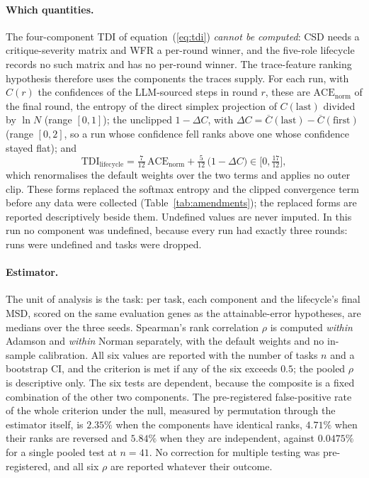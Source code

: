 \paragraph{Which quantities.} The four-component TDI of equation~(\ref{eq:tdi})
\emph{cannot be computed}: CSD needs a critique-severity matrix and WFR a per-round winner,
and the five-role lifecycle records no such matrix and has no per-round winner. The trace-feature ranking hypothesis therefore uses the components the
traces supply. For each run, with $C(r)$ the confidences of the LLM-sourced steps in round $r$,
these are $\mathrm{ACE}_{\mathrm{norm}}$ of the final round, the entropy of the direct simplex
projection of $C(\text{last})$ divided by $\ln N$ (range $[0,1]$); the unclipped $1-\Delta C$, with
$\Delta C=\overline{C}(\text{last})-\overline{C}(\text{first})$ (range $[0,2]$, so a run whose
confidence fell ranks above one whose confidence stayed flat); and
\begin{equation}
  \mathrm{TDI}_{\mathrm{lifecycle}} = \tfrac{7}{12}\,\mathrm{ACE}_{\mathrm{norm}}
    + \tfrac{5}{12}\,\bigl(1-\Delta C\bigr) \in \bigl[0,\tfrac{17}{12}\bigr],
\end{equation}
which renormalises the default weights over the two terms and applies no outer clip. These forms
replaced the softmax entropy and the clipped convergence term before any data were collected
(Table~\ref{tab:amendments}); the replaced forms are reported descriptively beside them.
Undefined values are never imputed. In this run no component was undefined, because every run
had exactly three rounds: \resHFourRunsUndefined{} runs were undefined and
\resHFourTasksDropped{} tasks were dropped.

\paragraph{Estimator.} The unit of analysis is the task: per task, each component and the
lifecycle's final MSD, scored on the same evaluation genes as the attainable-error hypotheses, are
medians over the three seeds. Spearman's rank correlation $\rho$ is computed \emph{within} Adamson and
\emph{within} Norman separately, with the default weights and no in-sample calibration. All six
values are reported with the number of tasks $n$ and a bootstrap CI, and the criterion is met if any of the six
exceeds $0.5$; the pooled $\rho$ is descriptive only. The six tests are dependent, because the
composite is a fixed combination of the other two components. The pre-registered false-positive
rate of the whole criterion under the null, measured by permutation through the estimator itself,
is $2.35\%$ when the components have identical ranks, $4.71\%$ when their ranks are reversed and
$5.84\%$ when they are independent, against $0.0475\%$ for a single pooled test at $n=41$. No
correction for multiple testing was pre-registered, and all six $\rho$ are reported whatever their
outcome.

